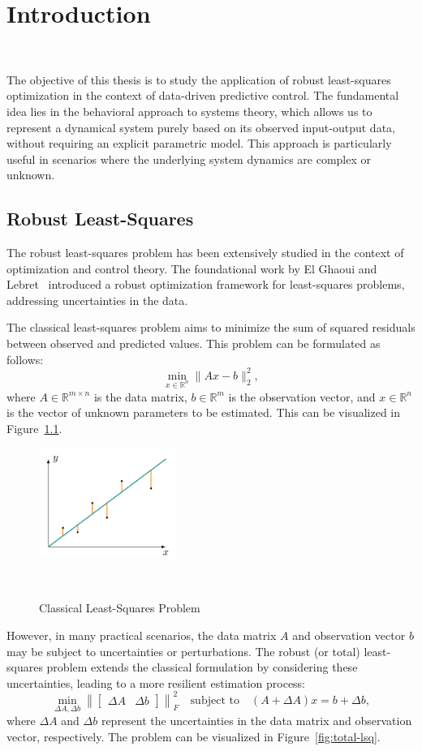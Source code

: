 \chapter{Introduction}~\label{ch:Introduction}

The objective of this thesis is to study the application of robust least-squares optimization in the context of data-driven predictive control. The fundamental idea lies in the behavioral approach to systems theory, which allows us to represent a dynamical system purely based on its observed input-output data, without requiring an explicit parametric model. This approach is particularly useful in scenarios where the underlying system dynamics are complex or unknown.

\section{Robust Least-Squares}
The robust least-squares problem has been extensively studied in the context of optimization and control theory. The foundational work by El Ghaoui and Lebret~\cite{ghaoui97} introduced a robust optimization framework for least-squares problems, addressing uncertainties in the data.

The classical least-squares problem aims to minimize the sum of squared residuals between observed and predicted values. This problem can be formulated as follows:
\[\min_{x \in \mathbb{R}^n} \|Ax - b\|_2^2,\]
where \(A \in \mathbb{R}^{m \times n}\) is the data matrix, \(b \in \mathbb{R}^m\) is the observation vector, and \(x \in \mathbb{R}^n\) is the vector of unknown parameters to be estimated. This can be visualized in Figure~\ref{fig:lsq}.
\begin{figure}[h]
    \centering
    \includegraphics[width=0.4\textwidth]{figures/lsq.png}
    \caption{Classical Least-Squares Problem}~\label{fig:lsq}
\end{figure}

However, in many practical scenarios, the data matrix \(A\) and observation vector \(b\) may be subject to uncertainties or perturbations. The robust (or total) least-squares problem extends the classical formulation by considering these uncertainties, leading to a more resilient estimation process:
\[
\min_{\Delta A, \Delta b} \left\| \begin{bmatrix} \Delta A & \Delta b \end{bmatrix} \right\|_F^2
\quad\text{subject to}\quad
(A + \Delta A)x = b + \Delta b,
\]
where \(\Delta A\) and \(\Delta b\) represent the uncertainties in the data matrix and observation vector, respectively. The problem can be visualized in Figure~\ref{fig:total-lsq}. 

